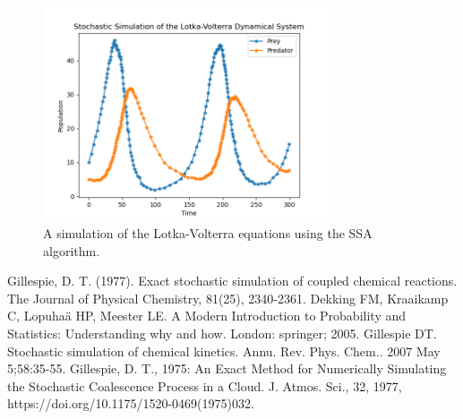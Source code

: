 \documentclass[12pt]{article}
\begin{document}
\begin{figure}
\centering
\includegraphics[width=0.75\textwidth]{Lotka-Volterra_SSA.png}
\caption{A simulation of the Lotka-Volterra equations using the SSA algorithm.}
\label{fig:LV_SSA}
\end{figure}
\begin{thebibliography}{9}
Gillespie, D. T. (1977). Exact stochastic simulation of coupled chemical reactions. The Journal of Physical Chemistry, 81(25), 2340-2361.
Dekking FM, Kraaikamp C, Lopuhaä HP, Meester LE. A Modern Introduction to Probability and Statistics: Understanding why and how. London: springer; 2005.
Gillespie DT. Stochastic simulation of chemical kinetics. Annu. Rev. Phys. Chem.. 2007 May 5;58:35-55.
Gillespie, D. T., 1975: An Exact Method for Numerically Simulating the Stochastic Coalescence Process in a Cloud. J. Atmos. Sci., 32, 1977, https://doi.org/10.1175/1520-0469(1975)032.
\end{thebibliography}
\end{document}

